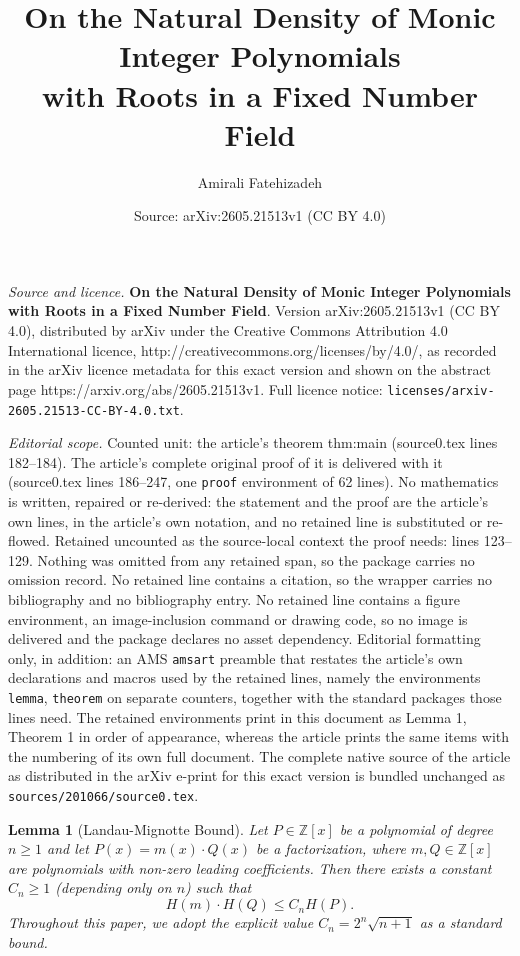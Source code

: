 \documentclass[10pt,a4paper]{amsart}
\title{\textbf{On the Natural Density of Monic Integer Polynomials \\ with Roots in a Fixed Number Field}}
\author{Amirali Fatehizadeh}
\date{Source: arXiv:2605.21513v1 (CC BY 4.0)}
\newtheorem{lemma}{Lemma}
\newcommand{\Z}{\mathbb{Z}}
\begin{document}
\maketitle

\noindent\emph{Source and licence.} \textbf{On the Natural Density of Monic Integer Polynomials \\ with Roots in a Fixed Number Field}. Version arXiv:2605.21513v1 (CC BY 4.0), distributed by arXiv under the Creative Commons Attribution 4.0 International licence, http://creativecommons.org/licenses/by/4.0/, as recorded in the arXiv licence metadata for this exact version and shown on the abstract page https://arxiv.org/abs/2605.21513v1. Full licence notice: \texttt{licenses/arxiv-2605.21513-CC-BY-4.0.txt}.\par\smallskip

\noindent\textit{Editorial scope.} Counted unit: the article's theorem thm:main (source0.tex lines 182--184). The article's complete original proof of it is delivered with it (source0.tex lines 186--247, one \texttt{proof} environment of 62 lines). No mathematics is written, repaired or re-derived: the statement and the proof are the article's own lines, in the article's own notation, and no retained line is substituted or re-flowed.  Retained uncounted as the source-local context the proof needs: lines 123--129.  Nothing was omitted from any retained span, so the package carries no omission record.  No retained line contains a citation, so the wrapper carries no bibliography and no bibliography entry.  No retained line contains a figure environment, an image-inclusion command or drawing code, so no image is delivered and the package declares no asset dependency.  Editorial formatting only, in addition: an AMS \texttt{amsart} preamble that restates the article's own declarations and macros used by the retained lines, namely the environments \texttt{lemma}, \texttt{theorem} on separate counters, together with the standard packages those lines need.  The retained environments print in this document as Lemma 1, Theorem 1 in order of appearance, whereas the article prints the same items with the numbering of its own full document.  The complete native source of the article as distributed in the arXiv e-print for this exact version is bundled unchanged as \texttt{sources/201066/source0.tex}.
\begin{lemma}[Landau-Mignotte Bound]\label{lem:landau}
Let $P \in \Z[x]$ be a polynomial of degree $n \ge 1$ and let $P(x) = m(x) \cdot Q(x)$ be a factorization, where $m, Q \in \Z[x]$ are polynomials with non-zero leading coefficients. Then there exists a constant $C_n \ge 1$ (depending only on $n$) such that
\begin{equation*}
    H(m) \cdot H(Q) \le C_n H(P).
\end{equation*}
Throughout this paper, we adopt the explicit value $C_n = 2^n \sqrt{n+1}$ as a standard bound.
\end{lemma}
\end{document}
